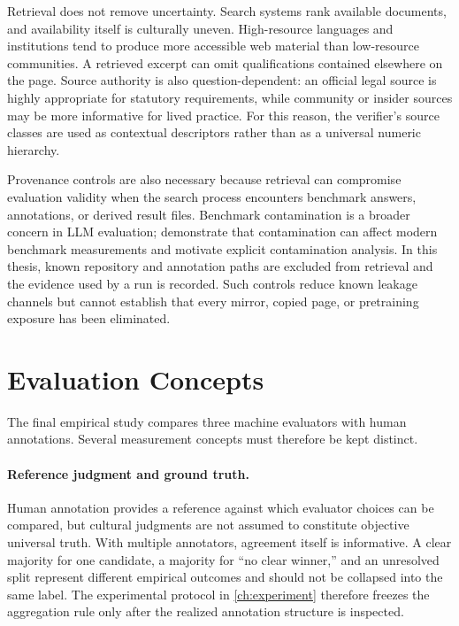 Retrieval does not remove uncertainty. Search systems rank available documents, and availability itself is culturally uneven. High-resource languages and institutions tend to produce more accessible web material than low-resource communities. A retrieved excerpt can omit qualifications contained elsewhere on the page. Source authority is also question-dependent: an official legal source is highly appropriate for statutory requirements, while community or insider sources may be more informative for lived practice. For this reason, the verifier's source classes are used as contextual descriptors rather than as a universal numeric hierarchy.

Provenance controls are also necessary because retrieval can compromise evaluation validity when the search process encounters benchmark answers, annotations, or derived result files. Benchmark contamination is a broader concern in LLM evaluation; \textcite{deng2024contamination} demonstrate that contamination can affect modern benchmark measurements and motivate explicit contamination analysis. In this thesis, known repository and annotation paths are excluded from retrieval and the evidence used by a run is recorded. Such controls reduce known leakage channels but cannot establish that every mirror, copied page, or pretraining exposure has been eliminated.

\section{Evaluation Concepts}
\label{sec:background-evaluation}

The final empirical study compares three machine evaluators with human annotations. Several measurement concepts must therefore be kept distinct.

\paragraph{Reference judgment and ground truth.} Human annotation provides a reference against which evaluator choices can be compared, but cultural judgments are not assumed to constitute objective universal truth. With multiple annotators, agreement itself is informative. A clear majority for one candidate, a majority for ``no clear winner,'' and an unresolved split represent different empirical outcomes and should not be collapsed into the same label. The experimental protocol in \cref{ch:experiment} therefore freezes the aggregation rule only after the realized annotation structure is inspected.

